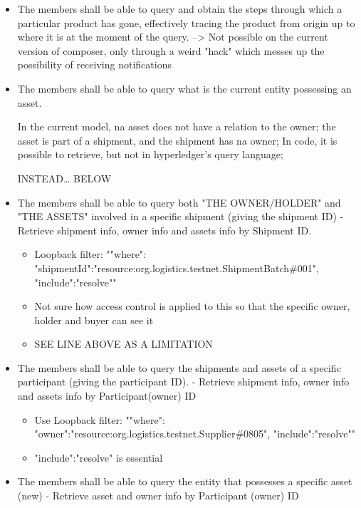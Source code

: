         \begin{itemize}
			\item The members shall be able to query and obtain the steps through which a particular product has gone, effectively tracing the product from origin up to where it is at the moment of the query. --> Not possible on the current version of composer, only through a weird "hack" which messes up the possibility of receiving notifications
			\item The members shall be able to query what is the current entity possessing an asset.
				\par In the current model, na asset does not have a relation to the owner; the asset is part of a shipment, and the shipment has na owner; In code, it is possible to retrieve, but not in hyperledger's query language;
				\par INSTEAD… BELOW
            \item The members shall be able to query both "THE OWNER/HOLDER" and "THE ASSETS" involved in a specific shipment (giving the shipment ID) - Retrieve shipment info, owner info and assets info by Shipment ID.
                \begin{itemize}
				\item Loopback filter: "{"where": {"shipmentId":"resource:org.logistics.testnet.ShipmentBatch\#001"}, "include":"resolve"}" 
				\item  Not sure how access control is applied to this so that the specific owner, holder and buyer can see it
                \item  SEE LINE ABOVE AS A LIMITATION 
                \end{itemize}
            \item The members shall be able to query the shipments and assets of a specific participant (giving the participant ID). - Retrieve shipment info, owner info and assets info by Participant(owner) ID
            \begin{itemize}
            \item  Use Loopback filter: "{"where": {"owner":"resource:org.logistics.testnet.Supplier\#0805"}, "include":"resolve"}"  
            \item  "include":"resolve" is essential
            \end{itemize}
            \item The members shall be able to query the entity that possesses a specific asset (new) - Retrieve asset and owner info by Participant (owner) ID
            \begin{itemize}

\end{itemize}
\end{itemize}
